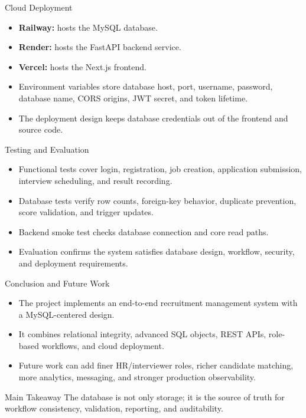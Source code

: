 \documentclass[aspectratio=169]{beamer}
\begin{document}
\begin{frame}{Cloud Deployment}
  \begin{itemize}
    \item \textbf{Railway:} hosts the MySQL database.
    \item \textbf{Render:} hosts the FastAPI backend service.
    \item \textbf{Vercel:} hosts the Next.js frontend.
    \item Environment variables store database host, port, username, password, database name, CORS origins, JWT secret, and token lifetime.
    \item The deployment design keeps database credentials out of the frontend and source code.
  \end{itemize}
\end{frame}

\begin{frame}{Testing and Evaluation}
  \begin{itemize}
    \item Functional tests cover login, registration, job creation, application submission, interview scheduling, and result recording.
    \item Database tests verify row counts, foreign-key behavior, duplicate prevention, score validation, and trigger updates.
    \item Backend smoke test checks database connection and core read paths.
    \item Evaluation confirms the system satisfies database design, workflow, security, and deployment requirements.
  \end{itemize}
\end{frame}

\begin{frame}{Conclusion and Future Work}
  \begin{itemize}
    \item The project implements an end-to-end recruitment management system with a MySQL-centered design.
    \item It combines relational integrity, advanced SQL objects, REST APIs, role-based workflows, and cloud deployment.
    \item Future work can add finer HR/interviewer roles, richer candidate matching, more analytics, messaging, and stronger production observability.
  \end{itemize}
  \vspace{0.8em}
  \begin{block}{Main Takeaway}
    The database is not only storage; it is the source of truth for workflow consistency, validation, reporting, and auditability.
  \end{block}
\end{frame}
\end{document}
